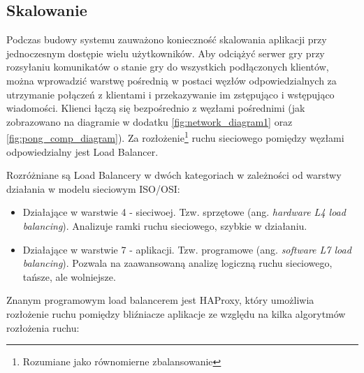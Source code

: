 \subsection{Skalowanie}
\label{subsub:scalability}

Podczas budowy systemu zauważono konieczność skalowania aplikacji przy jednoczesnym dostępie wielu użytkowników. Aby odciążyć serwer gry przy rozsyłaniu komunikatów o stanie gry do wszystkich podłączonych klientów, można wprowadzić warstwę pośrednią w postaci węzłów odpowiedzialnych za utrzymanie połączeń z klientami i przekazywanie im zstępująco i wstępująco wiadomości. Klienci łączą się bezpośrednio z węzłami pośrednimi (jak zobrazowano na diagramie w dodatku \ref{fig:network_diagram1} oraz \ref{fig:pong_comp_diagram}). Za rozłożenie\footnote{Rozumiane jako równomierne zbalansowanie} ruchu sieciowego pomiędzy węzłami odpowiedzialny jest Load Balancer.

Rozróżniane są Load Balancery w dwóch kategoriach w zależności od warstwy działania w modelu sieciowym ISO/OSI:
\begin{itemize}
	\item Działające w warstwie 4 - sieciwoej. Tzw. sprzętowe (ang. \emph{hardware L4 load balancing}). Analizuje ramki ruchu sieciowego, szybkie w działaniu.
	\item Działające w warstwie 7 - aplikacji. Tzw. programowe (ang. \emph{software L7 load balancing}). Pozwala na zaawansowaną analizę logiczną ruchu sieciowego, tańsze, ale wolniejsze.
\end{itemize}

Znanym programowym load balancerem jest HAProxy, który umożliwia rozłożenie ruchu pomiędzy bliźniacze aplikacje ze względu na kilka algorytmów rozłożenia ruchu\cite{haproxy-conf}:

